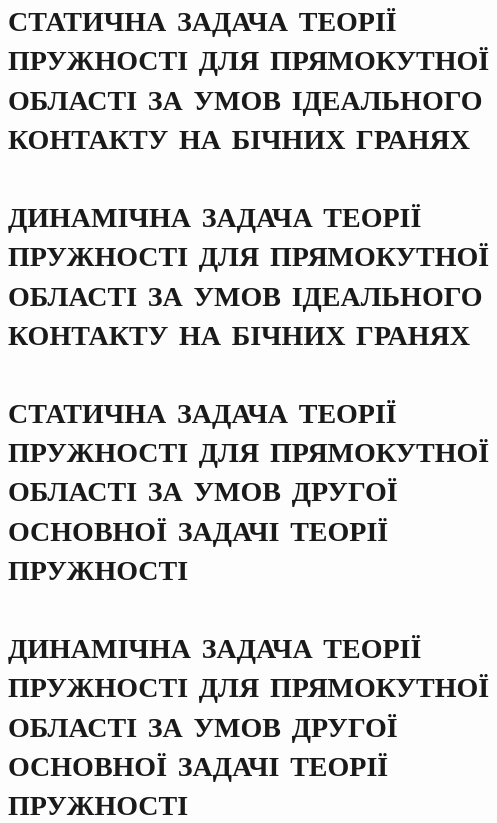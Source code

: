\documentclass[a4paper,14pt]{extarticle}
\numberwithin{equation}{section}
\begin{document}
\section{\centering СТАТИЧНА ЗАДАЧА ТЕОРІЇ ПРУЖНОСТІ ДЛЯ ПРЯМОКУТНОЇ ОБЛАСТІ
ЗА УМОВ ІДЕАЛЬНОГО КОНТАКТУ НА БІЧНИХ ГРАНЯХ}

\newpage

\section{\centering ДИНАМІЧНА ЗАДАЧА ТЕОРІЇ ПРУЖНОСТІ ДЛЯ ПРЯМОКУТНОЇ ОБЛАСТІ
ЗА УМОВ ІДЕАЛЬНОГО КОНТАКТУ НА БІЧНИХ ГРАНЯХ}

\newpage

\section{\centering СТАТИЧНА ЗАДАЧА ТЕОРІЇ ПРУЖНОСТІ ДЛЯ ПРЯМОКУТНОЇ ОБЛАСТІ
ЗА УМОВ ДРУГОЇ ОСНОВНОЇ ЗАДАЧІ ТЕОРІЇ ПРУЖНОСТІ}

\newpage

\section{\centering ДИНАМІЧНА ЗАДАЧА ТЕОРІЇ ПРУЖНОСТІ ДЛЯ ПРЯМОКУТНОЇ ОБЛАСТІ
ЗА УМОВ ДРУГОЇ ОСНОВНОЇ ЗАДАЧІ ТЕОРІЇ ПРУЖНОСТІ}

\newpage
\end{document}

